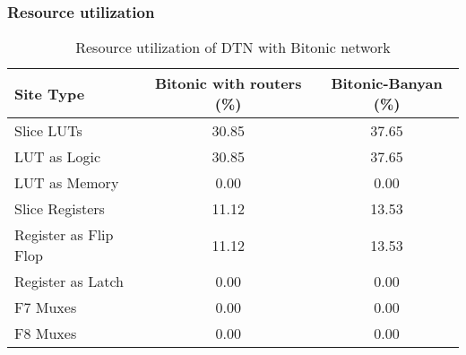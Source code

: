 \begin{frame}[shrink=15]
\frametitle{Resource utilization}
\begin{table}
  \begin{tabular}{l | c | c }
     \textbf{Site Type}  & \textbf{Bitonic with routers (\%)} & \textbf{Bitonic-Banyan (\%)} \\
    \hline \hline
    Slice LUTs 			& 30.85 & 37.65 \\ 
    \quad LUT as Logic		& 30.85 & 37.65 \\
    \quad LUT as Memory		& 0.00 & 0.00 	\\
    Slice Registers 		& 11.12	& 13.53 \\
    \quad Register as Flip Flop	& 11.12	& 13.53	\\
    \quad Register as Latch	& 0.00	& 0.00	\\
    F7 Muxes			& 0.00	& 0.00	\\
    F8 Muxes 			& 0.00	& 0.00	\\
  \end{tabular}
  \caption{Resource utilization of DTN with Bitonic network}
\end{table}
\end{frame}